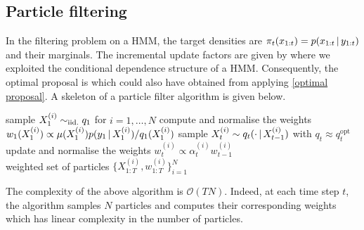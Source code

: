 \subsection{Particle filtering}
In the filtering problem on a HMM, the target densities are $\pi_{t}(x_{1:t})=p(x_{1:t}\,|\, y_{1:t})$ and their marginals. The incremental update factors are given by
where we exploited the conditional dependence structure of a HMM. Consequently, the optimal proposal is
which could also have obtained from applying \eqref{optimal proposal}. A skeleton of a particle filter algorithm is given below.
%
\begin{algorithm}[!h]\small
	\caption{\label{alg:particle-filter}}
	\begin{algorithmic}[1]
		\State sample $X_{1}^{(i)}\sim_{\mathrm{iid.}} q_{1}$ for $i=1,\dots,N$	%
		\State compute and normalise the weights $w_{1}(X^{(i)}_{1})\propto {\mu( X^{(i)}_{1})p(y_{1}\,|\,X^{(i)}_{1})/ q_{1}(X^{(i)}_{1})}$
			\State sample $X^{(i)}_{t}\sim q_{t}( \cdot \,|\, X^{(i)}_{t-1})$ with $q_{t}\approx q_{t}^{\text{opt}}$
			\State update and normalise the weights $w^{(i)}_{t}\propto\alpha^{(i)}_{t}w^{(i)}_{t-1}$
		\EndFor\\
		\Return weighted set of particles $\{X^{(i)}_{1:T},w^{(i)}_{1:T}\}_{i=1}^{N}$
	\end{algorithmic}
\end{algorithm}
%

The complexity of the above algorithm is $\mathcal O(TN)$. Indeed, at each time step $t$,  the algorithm samples $N$ particles and computes their corresponding weights which has linear complexity in the number of particles.

